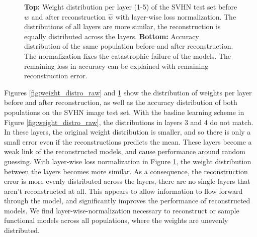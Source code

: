 \begin{figure}[ht!]
\begin{minipage}[t]{1.0\textwidth}
\begin{center}
\vskip -0.1in
\caption{
\textbf{Top:} Weight distribution per layer (1-5) of the SVHN test set before $w$ and after reconstruction $\hat{w}$ with layer-wise loss normalization.
The distributions of all layers are more similar, the reconstruction is equally distributed across the layers.
\textbf{Bottom:} Accuracy distribution of the same population before and after reconstruction. 
The normalization fixes the catastrophic failure of the models. The remaining loss in accuracy can be explained with remaining reconstruction error. 
}
\label{fig:weight_distro_norm}    
\end{center}
\end{minipage}
\end{figure}
Figures \ref{fig:weight_distro_raw} and \ref{fig:weight_distro_norm} show the distribution of weights per layer before and after reconstruction, as well as the accuracy distribution of both populations on the SVHN image test set. With the basline learning scheme in Figure \ref{fig:weight_distro_raw}, the distributions in layers 3 and 4 do not match. In these layers, the original weight distribution is smaller, and so there is only a small error even if the reconstructions predicts the mean. These layers become a weak link of the reconstructed models, and cause performance around random guessing.
With layer-wise loss normalization in Figure \ref{fig:weight_distro_norm}, the weight distribution between the layers becomes more similar. As a consequence, the reconstruction error is more evenly distributed across the layers, there are no single layers that aren't reconstructed at all.  
This appears to allow information to flow forward through the model, and significantly improves the performance of reconstructed models. 
We find layer-wise-normalization necessary to reconstruct or sample functional models across all populations, where the weights are unevenly distributed. 

